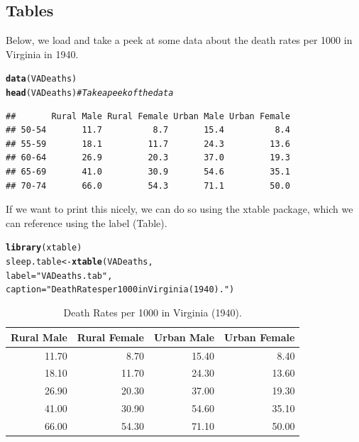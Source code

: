 \documentclass{article}\usepackage[]{graphicx}\usepackage[]{xcolor}
\makeatletter
\newcommand{\hlsng}[1]{\textcolor[rgb]{0.192,0.494,0.8}{#1}}%
\newcommand{\hlcom}[1]{\textcolor[rgb]{0.678,0.584,0.686}{\textit{#1}}}%
\newcommand{\hldef}[1]{\textcolor[rgb]{0.345,0.345,0.345}{#1}}%
\newcommand{\hlkwb}[1]{\textcolor[rgb]{0.69,0.353,0.396}{#1}}%
\newcommand{\hlkwc}[1]{\textcolor[rgb]{0.333,0.667,0.333}{#1}}%
\newcommand{\hlkwd}[1]{\textcolor[rgb]{0.737,0.353,0.396}{\textbf{#1}}}%
\newenvironment{kframe}{%
 \def\at@end@of@kframe{}%
 \ifinner\ifhmode%
  \def\at@end@of@kframe{\end{minipage}}%
  \begin{minipage}{\columnwidth}%
 \fi\fi%
 \def\FrameCommand##1{\hskip\@totalleftmargin \hskip-\fboxsep
 \colorbox{shadecolor}{##1}\hskip-\fboxsep
     \hskip-\linewidth \hskip-\@totalleftmargin \hskip\columnwidth}%
 \MakeFramed {\advance\hsize-\width
   \@totalleftmargin\z@ \linewidth\hsize
   \@setminipage}}%
 {\par\unskip\endMakeFramed%
 \at@end@of@kframe}
\newenvironment{knitrout}{}{} %
\makeatother
\begin{document}
\begin{multicols}{2}
\subsection{Tables}
Below, we load and take a peek at some data about the death rates per 1000 in Virginia in 1940.
\begin{knitrout}\scriptsize
{}\color{fgcolor}\begin{kframe}
\begin{alltt}
\hlkwd{data}\hldef{(VADeaths)}
\hlkwd{head}\hldef{(VADeaths)} \hlcom{# Take a peek of the data}
\end{alltt}
\begin{verbatim}
##       Rural Male Rural Female Urban Male Urban Female
## 50-54       11.7          8.7       15.4          8.4
## 55-59       18.1         11.7       24.3         13.6
## 60-64       26.9         20.3       37.0         19.3
## 65-69       41.0         30.9       54.6         35.1
## 70-74       66.0         54.3       71.1         50.0
\end{verbatim}
\end{kframe}
\end{knitrout}

If we want to print this nicely, we can do so using the xtable package, which we can reference using the label (Table).
\begin{knitrout}\scriptsize
{}\color{fgcolor}\begin{kframe}
\begin{alltt}
\hlkwd{library}\hldef{(xtable)}
\hldef{sleep.table}\hlkwb{<-}\hlkwd{xtable}\hldef{(VADeaths,}
                    \hlkwc{label} \hldef{=} \hlsng{"VADeaths.tab"}\hldef{,}
                    \hlkwc{caption} \hldef{=} \hlsng{"Death Rates per 1000 in Virginia (1940)."}\hldef{)}
\end{alltt}
\end{kframe}
\end{knitrout}

\begin{table}[H]
\centering
\begingroup\small
\begin{tabular}{rrrr}
  \hline
Rural Male & Rural Female & Urban Male & Urban Female \\ 
  \hline
11.70 & 8.70 & 15.40 & 8.40 \\ 
  18.10 & 11.70 & 24.30 & 13.60 \\ 
  26.90 & 20.30 & 37.00 & 19.30 \\ 
  41.00 & 30.90 & 54.60 & 35.10 \\ 
  66.00 & 54.30 & 71.10 & 50.00 \\ 
   \hline
\end{tabular}
\endgroup
\caption{Death Rates per 1000 in Virginia (1940).} 
\label{VADeaths.tab}
\end{table}



\end{multicols}
\end{document}
